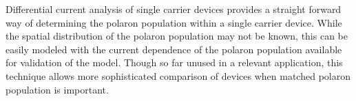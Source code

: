\documentclass[../thesis.tex]{subfiles}
\begin{document}
Differential current analysis of single carrier devices provides a straight forward way of determining the polaron population within a single carrier device.
While the spatial distribution of the polaron population may not be known, this can be easily modeled with the current dependence of the polaron population available for validation of the model.
Though so far unused in a relevant application, this technique allows more sophisticated comparison of devices when matched polaron population is important.









\end{document}
